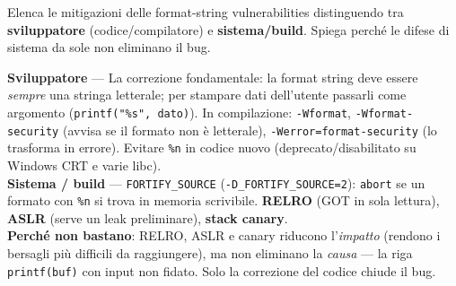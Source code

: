 \question[6]
Elenca le mitigazioni delle format-string vulnerabilities distinguendo tra \textbf{sviluppatore} (codice/compilatore) e \textbf{sistema/build}. Spiega perché le difese di sistema da sole non eliminano il bug.
\begin{solution}
\textbf{Sviluppatore} --- La correzione fondamentale: la format string deve essere \emph{sempre} una stringa letterale; per stampare dati dell'utente passarli come argomento (\lstinline|printf("%s", dato)|). In compilazione: \lstinline|-Wformat|, \lstinline|-Wformat-security| (avvisa se il formato non è letterale), \lstinline|-Werror=format-security| (lo trasforma in errore). Evitare \lstinline|%n| in codice nuovo (deprecato/disabilitato su Windows CRT e varie libc).\\
\textbf{Sistema / build} --- \lstinline|FORTIFY_SOURCE| (\lstinline|-D_FORTIFY_SOURCE=2|): \lstinline|abort| se un formato con \lstinline|%n| si trova in memoria scrivibile. \textbf{RELRO} (GOT in sola lettura), \textbf{ASLR} (serve un leak preliminare), \textbf{stack canary}.\\
\textbf{Perché non bastano}: RELRO, ASLR e canary riducono l'\emph{impatto} (rendono i bersagli più difficili da raggiungere), ma non eliminano la \emph{causa} --- la riga \lstinline|printf(buf)| con input non fidato. Solo la correzione del codice chiude il bug.
\end{solution}
